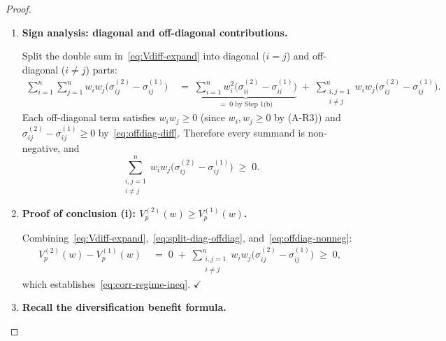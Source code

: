 \documentclass[12pt,openany]{book}
\newcommand{\bfw}{\mathbf{w}}
\numberwithin{equation}{chapter}
\theoremstyle{plain}
\theoremstyle{definition}
\theoremstyle{remark}
\def\bfw{w}%
\begin{document}
\begin{proof}
\begin{enumerate}
  \item \textbf{Sign analysis: diagonal and off-diagonal contributions.}

        Split the double sum in~\eqref{eq:Vdiff-expand} into diagonal
        ($i = j$) and off-diagonal ($i \neq j$) parts:
        \begin{align}
          \sum_{i=1}^{n}\sum_{j=1}^{n}
            w_i w_j \bigl(\sigma_{ij}^{(2)} - \sigma_{ij}^{(1)}\bigr)
          &\;=\; \underbrace{\sum_{i=1}^{n}
                   w_i^2\bigl(\sigma_{ii}^{(2)} - \sigma_{ii}^{(1)}\bigr)}_{=\;0
                   \;\text{by Step 1(b)}}
                 \;+\;
                 \sum_{\substack{i,j=1 \\ i \neq j}}^{n}
                   w_i w_j \bigl(\sigma_{ij}^{(2)} - \sigma_{ij}^{(1)}\bigr).
          \label{eq:split-diag-offdiag}
        \end{align}
        Each off-diagonal term satisfies
        $w_i w_j \geq 0$ (since $w_i, w_j \geq 0$ by \textup{(A-R3)})
        and $\sigma_{ij}^{(2)} - \sigma_{ij}^{(1)} \geq 0$
        by~\eqref{eq:offdiag-diff}.  Therefore every summand is
        non-negative, and
        \begin{equation}
          \sum_{\substack{i,j=1 \\ i \neq j}}^{n}
            w_i w_j \bigl(\sigma_{ij}^{(2)} - \sigma_{ij}^{(1)}\bigr)
          \;\geq\; 0.
          \label{eq:offdiag-nonneg}
        \end{equation}

  \item \textbf{Proof of conclusion (i):
        $V_p^{(2)}(\bfw) \geq V_p^{(1)}(\bfw)$.}

        Combining~\eqref{eq:Vdiff-expand},~\eqref{eq:split-diag-offdiag},
        and~\eqref{eq:offdiag-nonneg}:
        \begin{align}
          V_p^{(2)}(\bfw) - V_p^{(1)}(\bfw)
          &\;=\; 0 \;+\;
                 \sum_{\substack{i,j=1 \\ i \neq j}}^{n}
                   w_i w_j \bigl(\sigma_{ij}^{(2)} - \sigma_{ij}^{(1)}\bigr)
          \;\geq\; 0,
        \end{align}
        which establishes~\eqref{eq:corr-regime-ineq}. \hfill
        $\checkmark$

  \item \textbf{Recall the diversification benefit formula.}


\end{enumerate}
\end{proof}
\end{document}
